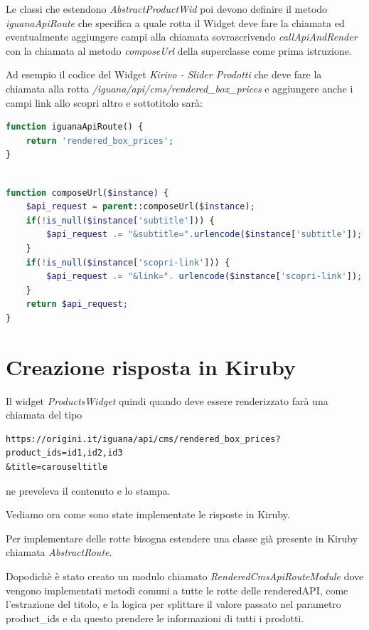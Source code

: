 Le classi che estendono \emph{AbstractProductWid} poi devono definire il metodo \emph{iguanaApiRoute} che specifica
a quale rotta il Widget deve fare la chiamata ed eventualmente aggiungere campi alla chiamata sovrascrivendo \emph{callApiAndRender} con la 
chiamata al metodo \emph{composeUrl} della superclasse come prima istruzione.

Ad esempio il codice del Widget \emph{Kirivo - Slider Prodotti} che deve fare la chiamata alla rotta \emph{/iguana/api/cms/rendered\_box\_prices} e aggiungere  anche i campi link allo scopri altro e sottotitolo sarà:

\begin{lstlisting}[style=customphp, language=Php,caption={Viene sovrascritto \emph{iguanaApiRoute} da \emph{ProductsWidget} per specificare la chiamata da effettuare}] 
function iguanaApiRoute() {
    return 'rendered_box_prices';
}
\end{lstlisting}

\begin{lstlisting}[style=customphp, language=Php,caption={Ridefinendo \emph{composeUrl} vengono aggiunti ulteriori campi specifici del Widget \emph{ProductsWidget}}] 

function composeUrl($instance) {
    $api_request = parent::composeUrl($instance);
    if(!is_null($instance['subtitle'])) {
        $api_request .= "&subtitle=".urlencode($instance['subtitle']);
    }
    if(!is_null($instance['scopri-link'])) {
        $api_request .= "&link=". urlencode($instance['scopri-link']);
    }
    return $api_request;
}
\end{lstlisting}

\section{Creazione risposta in Kiruby}

Il widget \emph{ProductsWidget} quindi quando deve essere renderizzato farà una chiamata del tipo
\begin{verbatim}
https://origini.it/iguana/api/cms/rendered_box_prices?product_ids=id1,id2,id3
&title=carouseltitle
\end{verbatim}
ne preveleva il contenuto e lo stampa.

Vediamo ora come sono state implementate le risposte in Kiruby.

Per implementare delle rotte bisogna estendere una classe già presente in Kiruby chiamata \emph{AbstractRoute}.

Dopodichè è stato creato un modulo chiamato \emph{RenderedCmsApiRouteModule} dove vengono implementati metodi comuni
a tutte le rotte delle renderedAPI, come l'estrazione del titolo, e la logica per splittare il valore passato nel
parametro product\_ids e da questo prendere le informazioni di tutti i prodotti.

